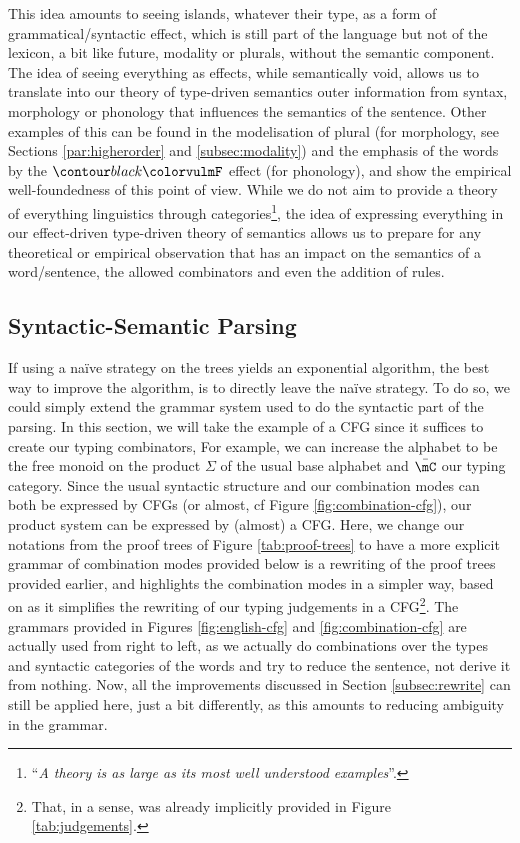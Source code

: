 This idea amounts to seeing islands, whatever their type, as a form of grammatical/syntactic effect, which is
still part of the language but not of the lexicon, a bit like future, modality or plurals, without the semantic
component.
The idea of seeing everything as effects, while semantically void, allows us to translate into our theory of
type-driven semantics outer information from syntax, morphology or phonology that influences the semantics of the
sentence.
Other examples of this can be found in the modelisation of plural (for morphology, see Sections \ref{par:higherorder}
and \ref{subsec:modality}) and the emphasis of the words by the $\f{F}$ effect (for phonology), and show the
empirical well-foundedness of this point of view.
While we do not aim to provide a theory of everything linguistics through categories\footnote{``\emph{A theory is as
		large as its most well understood examples}''.}, the idea of expressing everything in our effect-driven type-driven
theory of semantics allows us to prepare for any theoretical or empirical observation that has an impact on the
semantics of a word/sentence, the allowed combinators and even the addition of rules.

\subsection{Syntactic-Semantic Parsing}
\label{subsec:ssparsing}
If using a naïve strategy on the trees yields an exponential algorithm,
the best way to improve the algorithm, is to directly leave the naïve strategy.
To do so, we could simply extend the grammar system used to do the syntactic
part of the parsing.
In this section, we will take the example of a CFG since it suffices to create
our typing combinators,
For example, we can increase the alphabet to be the free monoid on the product
$\Sigma$ of the usual base alphabet and $\bar{\mC}$ our typing category.
Since the usual syntactic structure and our combination modes can both be
expressed by CFGs (or almost, cf Figure \ref{fig:combination-cfg}), our product
system can be expressed by (almost) a CFG.
Here, we change our notations from the proof trees of Figure
\ref{tab:proof-trees} to have a more explicit grammar of combination modes
provided below is a rewriting of the proof trees provided earlier, and
highlights the combination modes in a simpler way, based on
\cite{bumfordEffectdrivenInterpretationFunctors2025} as it simplifies the
rewriting of our typing judgements in a CFG\footnote{That, in a sense, was
	already implicitly provided in Figure \ref{tab:judgements}.}.
The grammars provided  in Figures \ref{fig:english-cfg} and \ref{fig:combination-cfg}
are actually used from right to left, as we actually do combinations over the
types and syntactic categories of the words and try to reduce the sentence, not
derive it from nothing.
Now, all the improvements discussed in Section \ref{subsec:rewrite}
can still be applied here, just a bit differently, as this amounts to reducing
ambiguity in the grammar.

